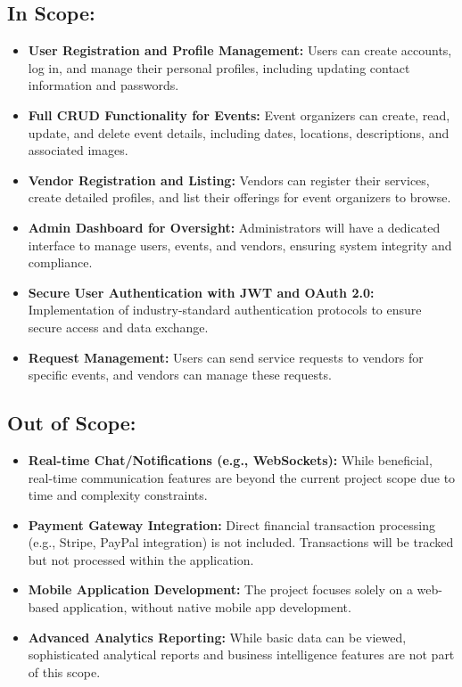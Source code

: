 \documentclass{report}
\begin{document}
\subsection{In Scope:}
\begin{itemize}
    \item \textbf{User Registration and Profile Management:} Users can create accounts, log in, and manage their personal profiles, including updating contact information and passwords.
    \item \textbf{Full CRUD Functionality for Events:} Event organizers can create, read, update, and delete event details, including dates, locations, descriptions, and associated images.
    \item \textbf{Vendor Registration and Listing:} Vendors can register their services, create detailed profiles, and list their offerings for event organizers to browse.
    \item \textbf{Admin Dashboard for Oversight:} Administrators will have a dedicated interface to manage users, events, and vendors, ensuring system integrity and compliance.
    \item \textbf{Secure User Authentication with JWT and OAuth 2.0:} Implementation of industry-standard authentication protocols to ensure secure access and data exchange.
    \item \textbf{Request Management:} Users can send service requests to vendors for specific events, and vendors can manage these requests.
\end{itemize}

\subsection{Out of Scope:}
\begin{itemize}
    \item \textbf{Real-time Chat/Notifications (e.g., WebSockets):} While beneficial, real-time communication features are beyond the current project scope due to time and complexity constraints.
    \item \textbf{Payment Gateway Integration:} Direct financial transaction processing (e.g., Stripe, PayPal integration) is not included. Transactions will be tracked but not processed within the application.
    \item \textbf{Mobile Application Development:} The project focuses solely on a web-based application, without native mobile app development.
    \item \textbf{Advanced Analytics Reporting:} While basic data can be viewed, sophisticated analytical reports and business intelligence features are not part of this scope.
\end{itemize}
\end{document}
